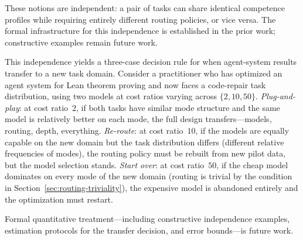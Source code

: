 \documentclass[twoside,11pt]{article}
\newcommand{\secref}[1]{Section~\ref{#1}}
\begin{document}
These notions are independent: a pair of tasks can share identical competence profiles while requiring entirely different routing policies, or vice versa.
The formal infrastructure for this independence is established in the prior work; constructive examples remain future work.

This independence yields a three-case decision rule for when agent-system results transfer to a new task domain.
Consider a practitioner who has optimized an agent system for Lean theorem proving and now faces a code-repair task distribution, using two models at cost ratios varying across $\{2, 10, 50\}$.
\emph{Plug-and-play}: at cost ratio~$2$, if both tasks have similar mode structure and the same model is relatively better on each mode, the full design transfers---models, routing, depth, everything.
\emph{Re-route}: at cost ratio~$10$, if the models are equally capable on the new domain but the task distribution differs (different relative frequencies of modes), the routing policy must be rebuilt from new pilot data, but the model selection stands.
\emph{Start over}: at cost ratio~$50$, if the cheap model dominates on every mode of the new domain (routing is trivial by the condition in \secref{sec:routing-triviality}), the expensive model is abandoned entirely and the optimization must restart.

Formal quantitative treatment---including constructive independence examples, estimation protocols for the transfer decision, and error bounds---is future work.
\end{document}
